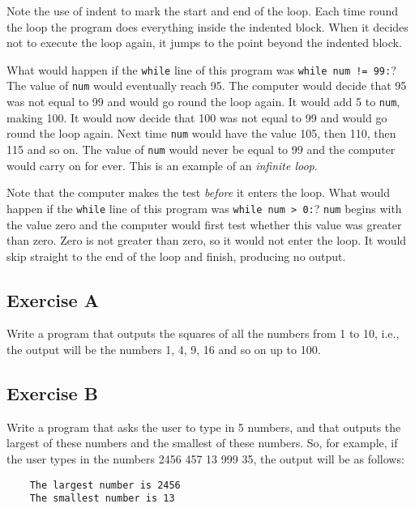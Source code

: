 Note the use of %
indent to mark the start and end of the loop.
Each time round the loop the program does everything inside
the indented block.
When it decides not to execute the loop again, it jumps to the point
beyond the indented block.

What would happen if the \texttt{while} line of this program was
\texttt{while num != 99:}?
The value of \texttt{num} would eventually reach 95.  The computer would
decide that 95 was not equal to 99 and would go round the loop again.
It would add 5 to \texttt{num}, making 100.
It would now decide that 100 was not equal to 99 and would go round the
loop again.  Next time \texttt{num} would have the value 105, then 110,
then 115 and so on.  The value of \texttt{num} would never be equal to 99
and the computer would carry on for ever.  This is an example of
an \emph{infinite loop}.

Note that the computer makes the test \emph{before} it enters the loop.
What would happen if the \texttt{while} line of this program was
\texttt{while num > 0:}?
\texttt{num} begins with the value zero and the computer would first
test whether this value was greater than zero.  Zero is not greater than
zero, so it would not enter the loop.  It would skip straight to the end
of the loop and finish, producing no output.


\subsection*{Exercise A}

Write a program that outputs the squares of all the numbers from 1 to
10, i.e., the output will be the numbers 1, 4, 9, 16 and so on up to 100.

\subsection*{Exercise B}

Write a program that asks the user to type in 5 numbers, and that
outputs the largest of these numbers and the smallest of these
numbers. So, for example, if the user types in the numbers
2456 457  13  999  35, the output will be as follows:

\begin{Verbatim}
    The largest number is 2456
    The smallest number is 13
\end{Verbatim}


